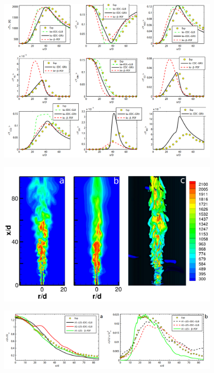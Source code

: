 \begin{figure}[H]
    \centering
    \includegraphics[width=0.95\linewidth]{figs/SandiaD/Screenshot from 2025-03-12 06-56-07.png}
    \label{fig:domain}
\end{figure}

\begin{figure}[H]
    \centering
    \includegraphics[width=0.95\linewidth]{figs/SandiaD/Screenshot from 2025-03-12 06-56-38.png}
    \label{fig:domain}
\end{figure}

\begin{figure}[H]
    \centering
    \includegraphics[width=0.95\linewidth]{figs/SandiaD/Screenshot from 2025-03-12 06-57-11.png}
    \label{fig:domain}
\end{figure}


